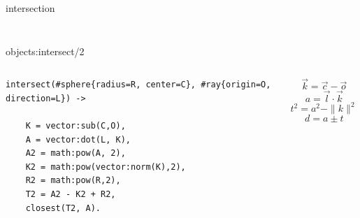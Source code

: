 \begin{frame}{intersection}
\begin{columns}
\begin{column}{0.4\linewidth}
\begin{figure}
\end{figure}
 \end{column}
\pause 
\begin{column}{0.6\linewidth}
  \pause
  \begin{itemize}
  \end{itemize}
 \end{column}
\end{columns} 
\end{frame}


\begin{frame}[fragile]{objects:intersect/2}

\begin{columns}
 \begin{column}{0.6\linewidth}
\begin{verbatim}
intersect(#sphere{radius=R, center=C}, #ray{origin=O, direction=L}) ->

    K = vector:sub(C,O),
    A = vector:dot(L, K),
    A2 = math:pow(A, 2),
    K2 = math:pow(vector:norm(K),2),
    R2 = math:pow(R,2),
    T2 = A2 - K2 + R2,
    closest(T2, A).
\end{verbatim}
 \end{column}
\pause
 \begin{column}{0.4\linewidth}

  $$\vec{k} =  \vec{c} - \vec{o}$$
  $$a = \vec{l}\cdot\vec{k}$$
  $${t}^2 = {a}^2 - \|k\|^2 + {r}^2 $$
  $$d = a\pm t$$
 \end{column}
\end{columns}
\end{frame}

